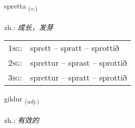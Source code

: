 \documentclass[frontgrid, backgrid]{flacards}\usepackage[]{graphicx}\usepackage[]{xcolor}
\begin{document}
\renewcommand{\flhead}{\vskip5pt \fboxsep=0pt {\small\bfseries\footnotesize Sagnorð | 动词}}
\renewcommand{\fcfoot}{\vskip5pt \fboxsep=0pt \hspace{2pt}{\small\bfseries\footnotesize 3K}}

\renewcommand{\blhead}{\vskip5pt {\small\bfseries\footnotesize Sagnorð | 动词 }}
\renewcommand{\bcfoot}{\vskip5pt \hspace{2pt}{\small\bfseries\footnotesize 3K}}


{spretta \small{\textsubscript{(\textit{v.})}} \\[1ex] %
\textphonetic{[sprɛhta]} \\
zh.: \emph{成长，发芽} \\  [2ex]
\renewcommand*{\arraystretch}{0.8}
\begin{tabular}{p{1cm}l}
\textsc{1sg}: & sprett -- spratt -- sprottið \\ 
\textsc{2sg}: & sprettur -- sprast -- sprottið \\ 
\textsc{3sg}: & sprettur -- spratt -- sprottið \\ 
\end{tabular}
}

\renewcommand{\flhead}{\vskip5pt \fboxsep=0pt {\small\bfseries\footnotesize Lýsingarorð | 形容词}}
\renewcommand{\fcfoot}{\vskip5pt \fboxsep=0pt \hspace{2pt}{\small\bfseries\footnotesize 3K}}

\renewcommand{\blhead}{\vskip5pt {\small\bfseries\footnotesize Lýsingarorð | 形容词 }}
\renewcommand{\bcfoot}{\vskip5pt \hspace{2pt}{\small\bfseries\footnotesize 3K}}


{gildur \small{\textsubscript{(\textit{adj.})}} \\[1ex] %
\textphonetic{[cɪltʏr]} \\
zh.: \emph{有效的} \\  [2ex]
\renewcommand*{\arraystretch}{0.8}
}
\end{document}

